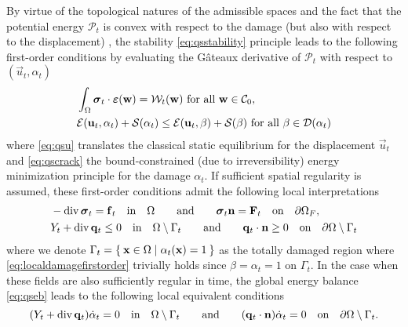 By virtue of the topological natures of the admissible spaces and the fact that the potential energy $\mathcal{P}_t$ is convex with respect to the damage (but also with respect to the displacement) \cite{PhamAmorMarigoMaurini:2011}, the stability \eqref{eq:qsstability} principle leads to the following first-order conditions by evaluating the Gâteaux derivative of $\mathcal{P}_t$ with respect to $(\vec{u}_t,\alpha_t)$
\begin{subequations}
\begin{align}
& \int_\Omega\sig_t\cdot\eps(\vec{w})=\mathcal{W}_t(\vec{w})\text{ for all $\vec{w}\in\mathcal{C}_0$}, \label{eq:qsu} \\
& \mathcal{E}(\vec{u}_t,\alpha_t)+\mathcal{S}(\alpha_t)\leq \mathcal{E}(\vec{u}_t,\beta)+\mathcal{S}(\beta)\text{ for all $\beta\in\mathcal{D}(\alpha_t)$} \label{eq:qscrack}
\end{align}
\end{subequations}
where \eqref{eq:qsu} translates the classical static equilibrium for the displacement $\vec{u}_t$ and \eqref{eq:qscrack} the bound-constrained (due to irreversibility) energy minimization principle for the damage $\alpha_t$. If sufficient spatial regularity is assumed, these first-order conditions admit the following local interpretations
\begin{subequations}
\begin{align}
& -\div\sig_t=\vec{f}_t\quad\text{in}\quad\Omega\qquad\text{and}\qquad\sig_t\vec{n}=\vec{F}_t\quad\text{on}\quad\partial\Omega_F, \\
& Y_t+\div\vec{q}_t\leq 0\quad\text{in}\quad\domaint\qquad\text{and}\qquad\vec{q}_t\cdot\vec{n}\geq 0\quad\text{on}\quad\partial\Omega\setminus\Gamma_t \label{eq:localdamagefirstorder}
\end{align}
\end{subequations}
where we denote $\Gamma_t=\set{\vec{x}\in\Omega|\alpha_t(\vec{x})=1}$ as the totally damaged region where \eqref{eq:localdamagefirstorder} trivially holds since $\beta=\alpha_t=1$ on $\Gamma_t$. In the case when these fields are also sufficiently regular in time, the global energy balance \eqref{eq:qseb} leads to the following local equivalent conditions
\begin{equation} \label{eq:damageconsis}
(Y_t+\div\vec{q}_t)\dot{\alpha}_t=0\quad\text{in}\quad\domaint\qquad\text{and}\qquad(\vec{q}_t\cdot\vec{n})\dot{\alpha}_t=0\quad\text{on}\quad\partial\Omega\setminus\Gamma_t.
\end{equation}
 

